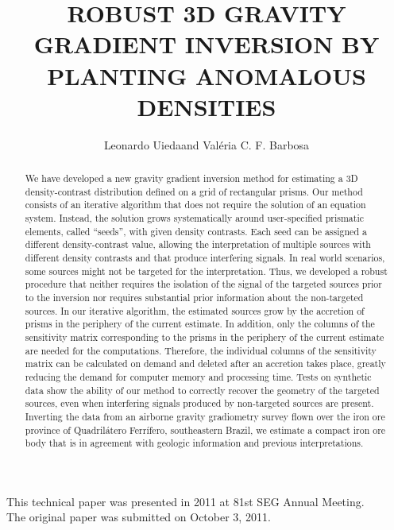 
\newcommand{\vect}[1]{\mathbf{#1}}
\newcommand{\mat}[1]{\mathbf{#1}}
\newcommand{\comp}[1]{#1^{\alpha\beta}}
\newcommand{\norm}[1]{\left|\left|#1\right|\right|}



\title{ROBUST 3D GRAVITY GRADIENT INVERSION BY\\ PLANTING ANOMALOUS DENSITIES}


\address{
    \footnotemark[1]
    Observat\'orio Nacional, Geophysics Department\\
    Rio de Janeiro, Brazil\\
    e-mail: leouieda@gmail.com; valcris@on.br}

\author{Leonardo Uieda\footnotemark[1] and
        Val\'eria C. F. Barbosa\footnotemark[1]}



{\center
This technical paper was presented in 2011 at 81st SEG Annual Meeting.\\
The original paper was submitted on October 3, 2011.\\[2cm]}

\begin{abstract}
We have developed a new gravity gradient inversion method for
estimating a 3D density-contrast distribution defined on a grid of rectangular
prisms.
Our method consists of an iterative algorithm that does not require the
solution of an equation system. Instead, the solution grows systematically
around user-specified prismatic elements, called ``seeds'', with given density
contrasts.
Each seed can be assigned a different density-contrast value,
allowing the interpretation of multiple sources with different density contrasts
and that produce interfering signals.
In real world scenarios, some sources might not be targeted for the
interpretation. Thus, we developed a robust procedure that neither requires the
isolation of the signal of the targeted sources
prior to the inversion nor requires substantial prior information about
the non-targeted sources.
In our iterative algorithm, the estimated sources grow
by the accretion of prisms in the periphery of the current estimate.
In addition, only the columns of the sensitivity matrix
corresponding to the prisms in the periphery of the current estimate are
needed for the computations.
Therefore, the individual columns of the sensitivity matrix
can be calculated on demand and deleted after an accretion takes place, greatly
reducing the demand for computer memory and processing time.
Tests on synthetic data show the ability of our method to correctly recover the
geometry of the targeted sources, even when interfering
signals produced by non-targeted sources are
present.
Inverting the data from an airborne gravity gradiometry survey flown over the
iron ore province of Quadril\'atero Ferr\'ifero, southeastern Brazil, we
estimate a compact iron ore body that is in agreement with geologic information
and previous interpretations.
\end{abstract}

